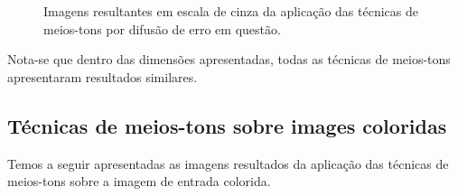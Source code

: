 \documentclass{article}
\begin{document}
\begin{figure}[!htp]
    \qquad
   	\quad
	
	\caption{Imagens resultantes em escala de cinza da aplicação das técnicas de meios-tons por difusão de erro em questão.}%
	\label{fig:imagem:plano:baboon}%
\end{figure}	

Nota-se que dentro das dimensões apresentadas, todas as técnicas de meios-tons apresentaram resultados similares.

\newpage
\subsection{Técnicas de meios-tons sobre images coloridas}
Temos a seguir apresentadas as imagens resultados da aplicação das técnicas de meios-tons sobre a imagem de entrada colorida.
\end{document}
